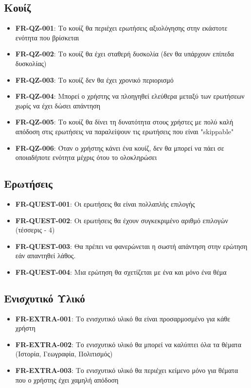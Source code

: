 \subsection{Κουίζ}
\begin{itemize}
    \item \textbf{\textlatin{FR-QZ-001}}: Το κουίζ θα περιέχει ερωτήσεις αξιολόγησης στην εκάστοτε ενότητα που βρίσκεται
    \item \textbf{\textlatin{FR-QZ-002}}: Το κουίζ θα έχει σταθερή δυσκολία (δεν θα υπάρχουν επίπεδα δυσκολίας)
    \item \textbf{\textlatin{FR-QZ-003}}: Το κουίζ δεν θα έχει χρονικό περιορισμό
    \item \textbf{\textlatin{FR-QZ-004}}: Μπορεί ο χρήστης να πλοηγηθεί ελεύθερα μεταξύ των ερωτήσεων χωρίς να έχει δώσει απάντηση
    \item \textbf{\textlatin{FR-QZ-005}}: Το κουίζ θα δίνει τη δυνατότητα στους χρήστες με πολύ  καλή απόδοση στις ερωτήσεις να παραλείψουν τις ερωτήσεις που είναι "\textlatin{skippable}"
    \item \textbf{\textlatin{FR-QZ-006}}: Όταν ο χρήστης κάνει ένα κουίζ, δεν θα μπορεί να πάει σε οποιαδήποτε ενότητα μέχρις ότου το ολοκληρώσει
\end{itemize}

\subsection{Ερωτήσεις}
\begin{itemize}
    \item \textbf{\textlatin{FR-QUEST-001}}: Οι ερωτήσεις θα είναι πολλαπλής επιλογής
    \item \textbf{\textlatin{FR-QUEST-002}}: Οι ερωτήσεις θα έχουν συγκεκριμένο αριθμό επιλογών (τέσσερις - 4)
    \item \textbf{\textlatin{FR-QUEST-003}}: Θα πρέπει να φανερώνεται η σωστή απάντηση στην ερώτηση εάν απαντηθεί λάθος.
    \item \textbf{\textlatin{FR-QUEST-004}}: Μια ερώτηση θα σχετίζεται με ένα και μόνο ένα θέμα
\end{itemize}

\subsection{Ενισχυτικό Υλικό}
\begin{itemize}
    \item \textbf{\textlatin{FR-EXTRA-001}}: Το ενισχυτικό υλικό θα είναι προσαρμοσμένο για κάθε χρήστη
    \item \textbf{\textlatin{FR-EXTRA-002}}: Το ενισχυτικό υλικό θα μπορεί να καλύπτει όλα τα θέματα (Ιστορία, Γεωγραφία, Πολιτισμός)
    \item \textbf{\textlatin{FR-EXTRA-003}}: Το ενισχυτικό υλικό θα περιέχει κείμενο μόνο για θέματα που ο χρήστης έχει χαμηλή απόδοση
\end{itemize}

